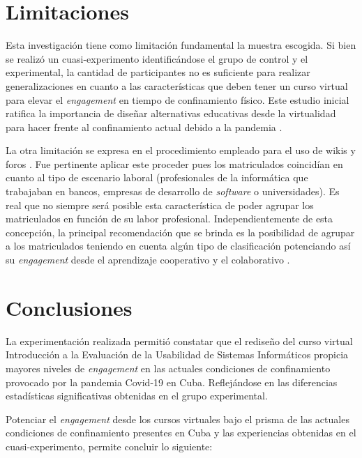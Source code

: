 \documentclass[spanish]{textolivre}
\begin{document}
\section{Limitaciones}
Esta investigación tiene como limitación fundamental la muestra escogida. Si bien se realizó un cuasi-experimento identificándose el grupo de control y el experimental, la cantidad de participantes no es suficiente para realizar generalizaciones en cuanto a las características que deben tener un curso virtual para elevar el \emph{engagement} en tiempo de confinamiento físico. Este estudio inicial ratifica la importancia de diseñar alternativas educativas desde la virtualidad para hacer frente al confinamiento actual debido a la pandemia \cite{smith2021}. %

La otra limitación se expresa en el procedimiento empleado para el uso de wikis y foros . Fue pertinente aplicar este proceder pues los matriculados coincidían en cuanto al tipo de escenario laboral (profesionales de la informática que trabajaban en bancos, empresas de desarrollo de \emph{software} o universidades). Es real que no siempre será posible esta característica de poder agrupar los matriculados en función de su labor profesional. Independientemente de esta concepción, la principal recomendación que se brinda es la posibilidad de agrupar a los matriculados teniendo en cuenta algún tipo de clasificación potenciando así su \emph{engagement} desde el aprendizaje cooperativo y el colaborativo \cite{cardona2015, li2020}. %

\section{Conclusiones}
La experimentación realizada permitió constatar que el rediseño del curso virtual Introducción a la Evaluación de la Usabilidad de Sistemas Informáticos propicia mayores niveles de \emph{engagement} en las actuales condiciones de confinamiento provocado por la pandemia Covid-19 en Cuba. Reflejándose en las diferencias estadísticas significativas obtenidas en el grupo experimental.

Potenciar el \emph{engagement} desde los cursos virtuales bajo el prisma de las actuales condiciones de confinamiento presentes en Cuba y las experiencias obtenidas en el cuasi-experimento, permite concluir lo siguiente:
\end{document}
